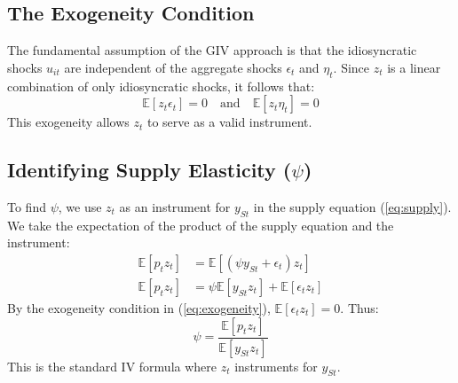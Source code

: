 \documentclass[12pt]{article}
\begin{document}
\subsection{The Exogeneity Condition}
The fundamental assumption of the GIV approach is that the idiosyncratic shocks $u_{it}$ are independent of the aggregate shocks $\epsilon_t$ and $\eta_t$. Since $z_t$ is a linear combination of only idiosyncratic shocks, it follows that:
\begin{equation}
    \mathbb{E}[z_t \epsilon_t] = 0 \quad \text{and} \quad \mathbb{E}[z_t \eta_t] = 0 \label{eq:exogeneity}
\end{equation}
This exogeneity allows $z_t$ to serve as a valid instrument.

\subsection{Identifying Supply Elasticity ($\psi$)}
To find $\psi$, we use $z_t$ as an instrument for $y_{St}$ in the supply equation (\ref{eq:supply}). We take the expectation of the product of the supply equation and the instrument:
\begin{align*}
    \mathbb{E}[p_t z_t] & = \mathbb{E}[(\psi y_{St} + \epsilon_t) z_t]               \\
    \mathbb{E}[p_t z_t] & = \psi \mathbb{E}[y_{St} z_t] + \mathbb{E}[\epsilon_t z_t]
\end{align*}
By the exogeneity condition in (\ref{eq:exogeneity}), $\mathbb{E}[\epsilon_t z_t] = 0$. Thus:
\begin{equation}
    \psi = \frac{\mathbb{E}[p_t z_t]}{\mathbb{E}[y_{St} z_t]}
\end{equation}
This is the standard IV formula where $z_t$ instruments for $y_{St}$.
\end{document}
